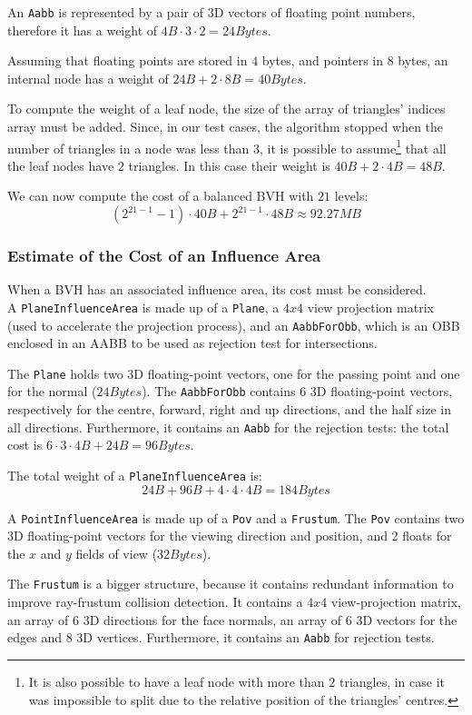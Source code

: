 \documentclass[acmtog, anonymous, review]{acmart}
\begin{document}
An \texttt{Aabb} is represented by a pair of 3D vectors of floating point numbers, therefore it has a weight of $4B \cdot 3 \cdot 2 = 24 Bytes$.

Assuming that floating points are stored in $4$ bytes, and pointers in $8$ bytes, an internal node has a weight of $24B + 2 \cdot 8B = 40 Bytes$. 

To compute the weight of a leaf node, the size of the array of triangles' indices array must be added. Since, in our test cases, the algorithm stopped when the number of triangles in a node was less than 3, it is possible to assume\footnote{It is also possible to have a leaf node with more than $2$ triangles, in case it was impossible to split due to the relative position of the triangles' centres.} that all the leaf nodes have $2$ triangles. In this case their weight is $40B + 2 \cdot 4B = 48B$.

We can now compute the cost of a balanced BVH with $21$ levels:
$$
(2^{21-1}-1) \cdot 40B + 2^{21-1} \cdot 48B \approx 92.27MB
$$

\subsubsection{Estimate of the Cost of an Influence Area}
When a BVH has an associated influence area, its cost must be considered. \\A \texttt{PlaneInfluenceArea} is made up of a \texttt{Plane}, a $4x4$ view projection matrix (used to accelerate the projection process), and an \texttt{AabbForObb}, which is an OBB enclosed in an AABB to be used as rejection test for intersections.

The \texttt{Plane} holds two 3D floating-point vectors, one for the passing point and one for the normal ($24 Bytes$). The \texttt{AabbForObb} contains $6$ 3D floating-point vectors, respectively for the centre, forward, right and up directions, and the half size in all directions. Furthermore, it contains an \texttt{Aabb} for the rejection tests: the total cost is $6 \cdot 3 \cdot 4B + 24B= 96 Bytes$.

The total weight of a \texttt{PlaneInfluenceArea} is:
$$
24B + 96B + 4\cdot 4 \cdot 4B = 184 Bytes
$$

A \texttt{PointInfluenceArea} is made up of a \texttt{Pov} and a \texttt{Frustum}. The \texttt{Pov} contains two 3D floating-point vectors for the viewing direction and position, and 2 floats for the $x$ and $y$ fields of view ($32 Bytes$).

The \texttt{Frustum} is a bigger structure, because it contains redundant information to improve ray-frustum collision detection. It contains a $4x4$ view-projection matrix, an array of $6$ 3D directions for the face normals, an array of $6$ 3D vectors for the edges and $8$ 3D vertices. Furthermore, it contains an \texttt{Aabb} for rejection tests. 
\end{document}
